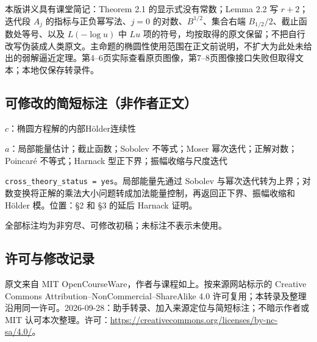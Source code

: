 \documentclass[UTF8,11pt]{ctexart}
\theoremstyle{definition}
\begin{document}
本版讲义具有课堂简记：Theorem 2.1 的显示式没有常数；Lemma 2.2 写 $r+2$；迭代段 $A_j$ 的指标与正负幂写法、$j=0$ 的对数、$B^{1/2}$、集合右端 $B_{1/2}/2$、截止函数处等号、以及 $L(-\log u)$ 中 $Lu$ 项的符号，均按取得的原文保留；不把自行改写伪装成人类原文。主命题的椭圆性使用范围在正文前说明，不扩大为此处未给出的弱解逼近定理。第4--6页实际查看原页图像，第7--8页图像接口失败但取得文本；本地仅保存转录件。
\subsection*{可修改的简短标注（非作者正文）}
$c$：椭圆方程解的内部Hölder连续性

$a$：局部能量估计；截止函数；Sobolev 不等式；Moser 幂次迭代；正解对数；Poincaré 不等式；Harnack 型正下界；振幅收缩与尺度迭代

\texttt{cross\_theory\_status = yes}。局部能量先通过 Sobolev 与幂次迭代转为上界；对数变换将正解的乘法大小问题转成加法能量控制，再返回正下界、振幅收缩和 Hölder 模。位置：§2 和 §3 的延后 Harnack 证明。

全部标注均为非穷尽、可修改初稿；未标注不表示未使用。
\subsection*{许可与修改记录}
原文来自 MIT OpenCourseWare，作者与课程如上。按来源网站标示的 Creative Commons Attribution--NonCommercial--ShareAlike 4.0 许可复用；本转录及整理沿用同一许可。2026-09-28：助手转录、加入来源定位与简短标注；不暗示作者或 MIT 认可本次整理。许可：\url{https://creativecommons.org/licenses/by-nc-sa/4.0/}。
\end{document}
